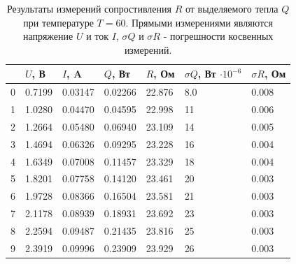 \documentclass[12pt]{article}
\begin{document}
\begin{table}[H]
    \centering
    \begin{tabular}{|l|l|l|l|l|l|l|}
        \hline
          & $U$, В & $I$, A  & $Q$, Вт & $R$, Ом & $\sigma Q$, Вт $\cdot 10^{-6}$ & $\sigma R$, Ом \\
        \hline
        0 & 0.7199 & 0.03147 & 0.02266 & 22.876  & 8.0                            & 0.008          \\
        1 & 1.0280 & 0.04470 & 0.04595 & 22.998  & 11                             & 0.006          \\
        2 & 1.2664 & 0.05480 & 0.06940 & 23.109  & 14                             & 0.005          \\
        3 & 1.4694 & 0.06326 & 0.09295 & 23.228  & 16                             & 0.004          \\
        4 & 1.6349 & 0.07008 & 0.11457 & 23.329  & 18                             & 0.004          \\
        5 & 1.8201 & 0.07758 & 0.14120 & 23.461  & 20                             & 0.003          \\
        6 & 1.9728 & 0.08366 & 0.16504 & 23.581  & 21                             & 0.003          \\
        7 & 2.1178 & 0.08939 & 0.18931 & 23.692  & 23                             & 0.003          \\
        8 & 2.2594 & 0.09487 & 0.21435 & 23.816  & 25                             & 0.003          \\
        9 & 2.3919 & 0.09996 & 0.23909 & 23.929  & 26                             & 0.003          \\
        \hline
    \end{tabular}
    
    \caption{Результаты измерений сопростивления \(R\) от выделяемого тепла \(Q\) при температуре \(T = 60\)\textcelsius.
        Прямыми измерениями являются напряжение \(U\) и ток \(I\), \(\sigma Q\) и \(\sigma R\) - погрешности косвенных измерений.}
    \label{tab:5}
\end{table}
\end{document}
